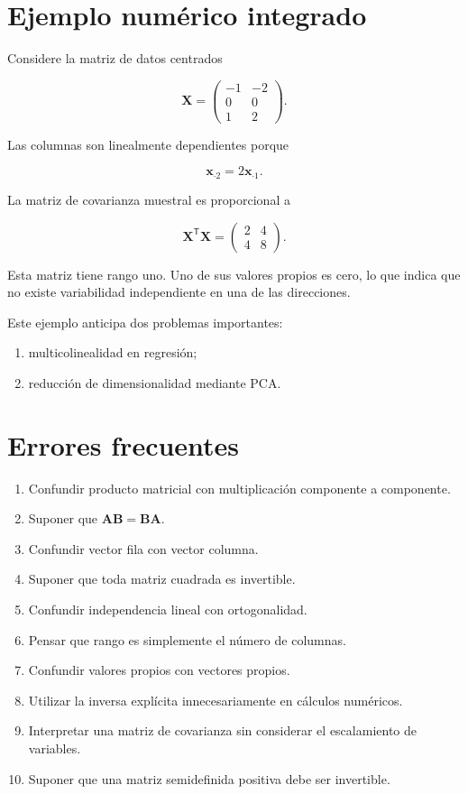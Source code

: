\documentclass[
  spanish,
  11pt,
  letterpaper,
  DIV=11,
  numbers=noendperiod]{scrreprt}
\providecommand{\tightlist}{%
  \setlength{\itemsep}{0pt}\setlength{\parskip}{0pt}}
\theoremstyle{definition}
\theoremstyle{plain}
\theoremstyle{definition}
\theoremstyle{remark}
\begin{document}
\section{Ejemplo numérico
integrado}\label{ejemplo-numuxe9rico-integrado}

Considere la matriz de datos centrados

\[
\mathbf{X}
=
\begin{pmatrix}
-1 & -2\\
0 & 0\\
1 & 2
\end{pmatrix}.
\]

Las columnas son linealmente dependientes porque

\[
\mathbf{x}_{\cdot 2}
=
2\mathbf{x}_{\cdot 1}.
\]

La matriz de covarianza muestral es proporcional a

\[
\mathbf{X}^{\mathsf T}\mathbf{X}
=
\begin{pmatrix}
2 & 4\\
4 & 8
\end{pmatrix}.
\]

Esta matriz tiene rango uno. Uno de sus valores propios es cero, lo que
indica que no existe variabilidad independiente en una de las
direcciones.

Este ejemplo anticipa dos problemas importantes:

\begin{enumerate}
\def\labelenumi{\arabic{enumi}.}
\tightlist
\item
  multicolinealidad en regresión;
\item
  reducción de dimensionalidad mediante PCA.
\end{enumerate}

\section{Errores frecuentes}\label{errores-frecuentes-1}

\begin{enumerate}
\def\labelenumi{\arabic{enumi}.}
\tightlist
\item
  Confundir producto matricial con multiplicación componente a
  componente.
\item
  Suponer que \(\mathbf{A}\mathbf{B}=\mathbf{B}\mathbf{A}\).
\item
  Confundir vector fila con vector columna.
\item
  Suponer que toda matriz cuadrada es invertible.
\item
  Confundir independencia lineal con ortogonalidad.
\item
  Pensar que rango es simplemente el número de columnas.
\item
  Confundir valores propios con vectores propios.
\item
  Utilizar la inversa explícita innecesariamente en cálculos numéricos.
\item
  Interpretar una matriz de covarianza sin considerar el escalamiento de
  variables.
\item
  Suponer que una matriz semidefinida positiva debe ser invertible.
\end{enumerate}
\end{document}
